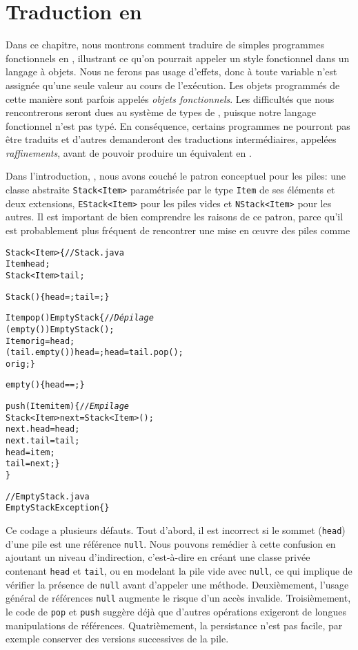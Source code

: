 \chapter{Traduction en \Java}

Dans ce chapitre, nous montrons comment traduire de simples programmes
fonctionnels en \Java, illustrant ce qu'on pourrait appeler un style
fonctionnel dans un langage à objets. Nous ne ferons pas usage
d'effets, donc à toute variable n'est assignée qu'une seule valeur au
cours de l'exécution. Les objets programmés de cette manière sont
parfois appelés \emph{objets fonctionnels}. Les difficultés que nous
rencontrerons seront dues au système de types de \Java, puisque notre
langage fonctionnel n'est pas typé. En conséquence, certains
programmes ne pourront pas être traduits et d'autres demanderont des
traductions intermédiaires, appelées \emph{raffinements}, avant de
pouvoir produire un équivalent en \Java.

Dans l'introduction, , nous avons couché le patron
conceptuel pour les piles: une classe abstraite \texttt{Stack<Item>}
paramétrisée par le type \texttt{Item} de ses éléments et deux
extensions, \texttt{EStack<Item>} pour les piles vides et
\texttt{NStack<Item>} pour les autres. Il est important de bien
comprendre les raisons de ce patron, parce qu'il est probablement plus
fréquent de rencontrer une mise en {\oe}uvre des piles comme
\begin{alltt}
\public \class Stack<Item> \{\hfill// Stack.java
  \private Item head;
  \private Stack<Item> tail;

  \public Stack() \{ head = \nullX; tail = \nullX; \}

  \public Item pop() \throws EmptyStack \{\hfill// \emph{Dépilage}
    \ifX (empty()) \throw \new EmptyStack();
    \final Item orig = head;
    \ifX (tail.empty()) head = \nullX; \elseX head = tail.pop();
    \return orig; \}

  \public \booleanX empty() \{ \return head == \nullX; \}

  \public \void push(\final Item item) \{\hfill// \emph{Empilage}
    Stack<Item> next = \new Stack<Item>();
    next.head = head;
    next.tail = tail;
    head = item;
    tail = next; \}
\}

// EmptyStack.java
\public \class EmptyStack \extends Exception \{\}
\end{alltt}
Ce codage a plusieurs défauts. Tout d'abord, il est incorrect si le
sommet (\texttt{head}) d'une pile est une référence
\texttt{null}. Nous pouvons remédier à cette confusion en ajoutant un
niveau d'indirection, c'est-à-dire en créant une classe privée
contenant \texttt{head} et \texttt{tail}, ou en modelant la pile vide
avec \texttt{null}, ce qui implique de vérifier la présence de
\texttt{null} avant d'appeler une méthode. Deuxièmement, l'usage
général de références \texttt{null} augmente le risque d'un accès
invalide. Troisièmement, le code de \texttt{pop} et \texttt{push}
suggère déjà que d'autres opérations exigeront de longues
manipulations de références. Quatrièmement, la persistance n'est pas
facile, par exemple conserver des versions successives de la pile.


